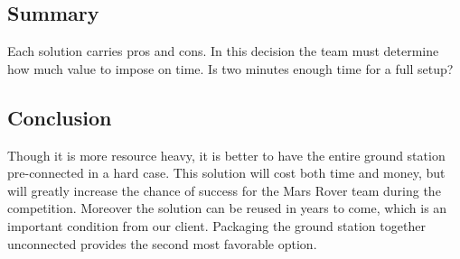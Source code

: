 \documentclass[onecolumn, draftclsnofoot, 10pt, compsoc]{IEEEtran}
\begin{document}
\subsection{Summary}
Each solution carries pros and cons.
In this decision the team must determine how much value to impose on time.
Is two minutes enough time for a full setup?

\subsection{Conclusion}
Though it is more resource heavy, it is better to have the entire ground station pre-connected in a hard case.
This solution will cost both time and money, but will greatly increase the chance of success for the Mars Rover team during the competition.
Moreover the solution can be reused in years to come, which is an important condition from our client.
Packaging the ground station together unconnected provides the second most favorable option.

\newpage

\end{document}
